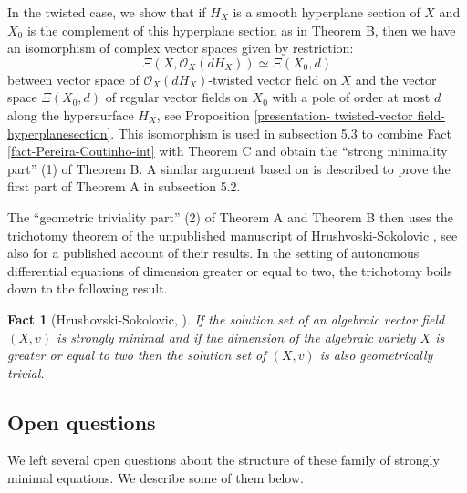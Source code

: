 \documentclass[12pt]{amsart}
\theoremstyle{definition}
\theoremstyle{plain}
\newtheorem{fact}[definition]{Fact}
\theoremstyle{exampstyle}
\theoremstyle{exampstyle}\newtheorem{thmxbis}{Theorem}
\numberwithin{equation}{section}
\theoremstyle{remark}
\begin{document}
In the twisted case, we show that if $H_X$ is a smooth hyperplane section of $X$ and $X_0$ is the complement of this hyperplane section as in Theorem B, then we have an isomorphism of complex vector spaces given by restriction: 
$$\Xi(X, \mathcal O_X(dH_X)) \simeq \Xi(X_0,d)$$
between vector space of $\mathcal O_X(dH_X)$-twisted vector field on $X$ and the vector space  $\Xi(X_0,d)$ of regular vector fields on $X_0$ with a pole of order at most $d$ along the hypersurface $H_X$, see Proposition \ref{presentation- twisted-vector field-hyperplanesection}. This isomorphism is used in subsection 5.3 to combine Fact \ref{fact-Pereira-Coutinho-int} with Theorem C and obtain the ``strong minimality part''  (1) of Theorem B. A similar argument based on \cite[Theorem 4.3]{Coutinho} is described to prove the first part of Theorem A in subsection 5.2.  

The ``geometric triviality part'' (2) of Theorem A and Theorem B then uses the trichotomy theorem of the unpublished manuscript of Hrushvoski-Sokolovic \cite{Hrushovski-Sokolovic}, see also \cite[Section 5.1]{Casale-Freitag-Nagloo} for a published account of their results. In the setting of autonomous differential equations of dimension greater or equal to two, the trichotomy boils down to the following result.
%
\begin{fact}[Hrushovski-Sokolovic, \cite{Hrushovski-Sokolovic}]\label{Hrushovski-Sokolovic}
If the solution set of an algebraic vector field $(X,v)$ is strongly minimal and if the dimension of the algebraic variety $X$ is greater or equal to two then the solution set of $(X,v)$ is also geometrically trivial. 
\end{fact}  



\subsection{Open questions} We left several open questions about the structure of these family of strongly minimal equations. We describe some of them below. 
\end{document}
